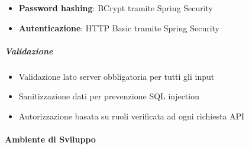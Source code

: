 \begin{itemize}[leftmargin=1.1em]
\item \textbf{Password hashing}: BCrypt tramite Spring Security
\item \textbf{Autenticazione}: HTTP Basic tramite Spring Security
\end{itemize}

\subparagraph{Validazione}

\begin{itemize}[leftmargin=1.1em]
\item Validazione lato server obbligatoria per tutti gli input
\item Sanitizzazione dati per prevenzione SQL injection
\item Autorizzazione basata su ruoli verificata ad ogni richiesta API
\end{itemize}

\paragraph{Ambiente di Sviluppo}
\label{subsubsec:ambiente-sviluppo}
